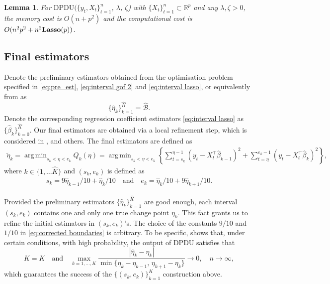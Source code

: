 \documentclass[11pt]{article}
\DeclareMathOperator*{\argmin}{arg\,min}
\theoremstyle{plain}
\newtheorem{lemma}[theorem]{Lemma}
\theoremstyle{definition}
\newcommand{\zifeng}[1]{\textcolor{purple}{(Zifeng: #1)}}
\begin{document}
\begin{lemma}\label{lemma:memory_computation_DPDU}
For $\mathrm{DPDU}(\{y_t, X_t\}_{t = 1}^n$, $\lambda$, $\zeta$) with $\{X_t\}_{t = 1}^n \subset \mathbb{R}^p$ and any $\lambda, \zeta > 0$, the memory cost is $O(n+p^2)$ and the computational  cost is $O(n^2p^2 + n^2 {\bf Lasso}(p))$.
\end{lemma}


\subsection{Final estimators}\label{sec:local_refinement}

Denote the preliminary estimators obtained from the optimisation problem specified in \eqref{eq:pre_est}, \eqref{eq:interval gof 2} and \eqref{eq:interval lasso}, or equivalently from  as 
\begin{equation}\label{eq:preliminary_cpt}
\{\widehat  {\eta}_k\}_{k = 1}^{\widehat{K}} = \widehat{\mathcal{B}}.
\end{equation}
Denote the corresponding regression coefficient estimators \eqref{eq:interval lasso} as $\{ \widehat  \beta_k \}_{k=0}^{\widehat{K}}$.  Our final estimators are obtained via a local refinement step, which is considered in \cite{rinaldo2021localizing}, \cite{yu2022localising} and others.  The final estimators are defined as
\begin{align}\label{eq:refinement}
    \widetilde{\eta}_k = \argmin_{s_k < \eta < e_k} Q_k(\eta) = \argmin_{s_k < \eta < e_k} \left\{\sum_{t = s_k }^{\eta-1}(y_t - X_t^{\top}\widehat{\beta}_{k-1})^2 + \sum_{t = \eta}^{e_k-1}(y_t - X_t^{\top}\widehat{\beta}_{k})^2\right\}, 
\end{align}
where $k \in \{1, \ldots \widehat{K}\}$ and $(s_k, e_k)$ is defined as
\begin{align}\label{eq:corrected boundaries}
   s_k = 9\widehat{\eta}_{k-1}/10 + \widehat{\eta}_{k}/10 \quad \text{and} \quad e_k = \widehat{\eta}_{k}/10 + 9\widehat{\eta}_{k+1}/10.
\end{align}

Provided the preliminary estimators $\{\widehat {\eta}_k\}_{k = 1}^{\widehat{K}}$ are good enough, each interval $(s_k, e_k)$ contains one and only one true change point $\eta_k$.  This fact grants us to refine the initial estimators in $(s_k, e_k)$'s.  The choice of the constants $9/10$ and $1/10$ in \eqref{eq:corrected boundaries} is arbitrary.  To be specific,  shows that, under certain conditions, with high probability, the output of DPDU satisfies that 
\[
    \widehat{K} = K \quad \mbox{and} \quad \max_{k = 1, \ldots, K} \frac{|\widehat{\eta}_k - \eta_k|}{\min\{\eta_k - \eta_{k-1}, \, \eta_{k+1} - \eta_k\}} \to 0, \quad n \to \infty,
\]
which guarantees the success of the $\{(s_k, e_k)\}_{k = 1}^K$ construction above.
\end{document}
